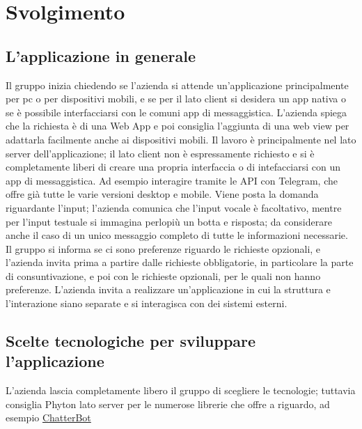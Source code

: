 \section{Svolgimento}
\subsection{L'applicazione in generale}
Il gruppo inizia chiedendo se l'azienda si attende un'applicazione principalmente 
per pc o per dispositivi mobili, e se per il lato client si desidera un app nativa 
o se è possibile interfacciarsi con le comuni app di messaggistica. \newline
L'azienda spiega che la richiesta è di una Web App e poi consiglia l'aggiunta di una 
web view per adattarla facilmente anche ai dispositivi mobili. Il lavoro è principalmente 
nel lato server dell'applicazione; il lato client non è espressamente richiesto e si è 
completamente liberi di creare una propria interfaccia o di intefacciarsi con un app di 
messaggistica. Ad esempio interagire tramite le API con Telegram, che offre già tutte 
le varie versioni desktop e mobile.\newline
Viene posta la domanda riguardante l'input; l'azienda comunica che l'input vocale 
è facoltativo, mentre per l'input testuale si immagina perlopiù un botta e risposta; 
da considerare anche il caso di un unico messaggio completo di tutte le informazioni necessarie.\newline
Il gruppo si informa se ci sono preferenze riguardo le richieste opzionali, e l'azienda invita 
prima a partire dalle richieste obbligatorie, in particolare la parte di consuntivazione, 
e poi con le richieste opzionali, per le quali non hanno preferenze.
L'azienda invita a realizzare un'applicazione in cui la struttura e l'interazione siano
separate e si interagisca con dei sistemi esterni.

\subsection{Scelte tecnologiche per sviluppare l'applicazione}
L'azienda lascia completamente libero il gruppo di scegliere le tecnologie; tuttavia 
consiglia Phyton lato server per le numerose librerie che offre a riguardo, 
ad esempio \href{https://chatterbot.readthedocs.io/en/stable/}{ChatterBot}


